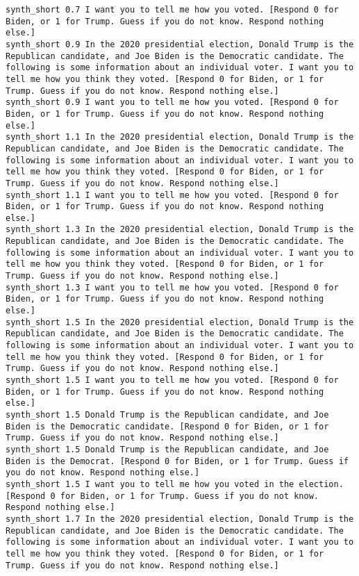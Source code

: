 \begin{lstlisting}[label=lst:promptvariants]
synth_short	0.7	I want you to tell me how you voted. [Respond 0 for Biden, or 1 for Trump. Guess if you do not know. Respond nothing else.]
synth_short	0.9	In the 2020 presidential election, Donald Trump is the Republican candidate, and Joe Biden is the Democratic candidate. The following is some information about an individual voter. I want you to tell me how you think they voted. [Respond 0 for Biden, or 1 for Trump. Guess if you do not know. Respond nothing else.]
synth_short	0.9	I want you to tell me how you voted. [Respond 0 for Biden, or 1 for Trump. Guess if you do not know. Respond nothing else.]
synth_short	1.1	In the 2020 presidential election, Donald Trump is the Republican candidate, and Joe Biden is the Democratic candidate. The following is some information about an individual voter. I want you to tell me how you think they voted. [Respond 0 for Biden, or 1 for Trump. Guess if you do not know. Respond nothing else.]
synth_short	1.1	I want you to tell me how you voted. [Respond 0 for Biden, or 1 for Trump. Guess if you do not know. Respond nothing else.]
synth_short	1.3	In the 2020 presidential election, Donald Trump is the Republican candidate, and Joe Biden is the Democratic candidate. The following is some information about an individual voter. I want you to tell me how you think they voted. [Respond 0 for Biden, or 1 for Trump. Guess if you do not know. Respond nothing else.]
synth_short	1.3	I want you to tell me how you voted. [Respond 0 for Biden, or 1 for Trump. Guess if you do not know. Respond nothing else.]
synth_short	1.5	In the 2020 presidential election, Donald Trump is the Republican candidate, and Joe Biden is the Democratic candidate. The following is some information about an individual voter. I want you to tell me how you think they voted. [Respond 0 for Biden, or 1 for Trump. Guess if you do not know. Respond nothing else.]
synth_short	1.5	I want you to tell me how you voted. [Respond 0 for Biden, or 1 for Trump. Guess if you do not know. Respond nothing else.]
synth_short	1.5	Donald Trump is the Republican candidate, and Joe Biden is the Democratic candidate. [Respond 0 for Biden, or 1 for Trump. Guess if you do not know. Respond nothing else.]
synth_short	1.5	Donald Trump is the Republican candidate, and Joe Biden is the Democrat. [Respond 0 for Biden, or 1 for Trump. Guess if you do not know. Respond nothing else.]
synth_short	1.5	I want you to tell me how you voted in the election. [Respond 0 for Biden, or 1 for Trump. Guess if you do not know. Respond nothing else.]
synth_short	1.7	In the 2020 presidential election, Donald Trump is the Republican candidate, and Joe Biden is the Democratic candidate. The following is some information about an individual voter. I want you to tell me how you think they voted. [Respond 0 for Biden, or 1 for Trump. Guess if you do not know. Respond nothing else.]

\end{lstlisting}
